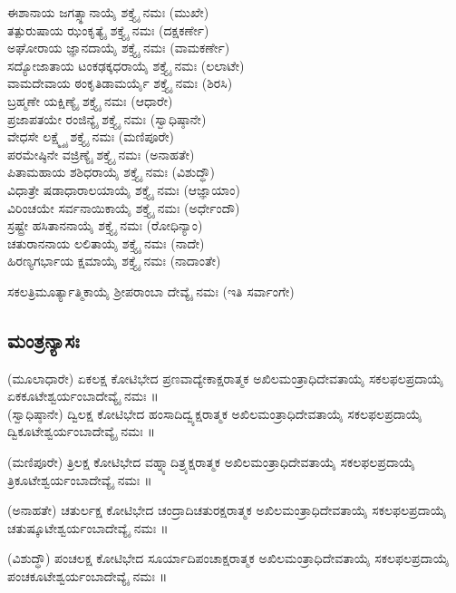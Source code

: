  ಈಶಾನಾಯ ಜಗತ್ಸ್ಥಾನಾಯೈ ಶಕ್ತ್ಯೈ ನಮಃ (ಮುಖೇ)\\
 ತತ್ಪುರುಷಾಯ ಝಂಕೃತ್ಯೈ ಶಕ್ತ್ಯೈ ನಮಃ (ದಕ್ಷಕರ್ಣೇ)\\
 ಅಘೋರಾಯ ಜ್ಞಾನದಾಯೈ ಶಕ್ತ್ಯೈ ನಮಃ (ವಾಮಕರ್ಣೇ)\\
 ಸದ್ಯೋಜಾತಾಯ ಟಂಕಢಕ್ಕಧರಾಯೈ ಶಕ್ತ್ಯೈ ನಮಃ (ಲಲಾಟೇ)\\
 ವಾಮದೇವಾಯ ಠಂಕೃತಿಡಾಮರ್ಯೈ ಶಕ್ತ್ಯೈ ನಮಃ (ಶಿರಸಿ)\\
 ಬ್ರಹ್ಮಣೇ ಯಕ್ಷಿಣ್ಯೈ ಶಕ್ತ್ಯೈ ನಮಃ (ಆಧಾರೇ)\\
 ಪ್ರಜಾಪತಯೇ ರಂಜಿನ್ಯೈ ಶಕ್ತ್ಯೈ ನಮಃ (ಸ್ವಾಧಿಷ್ಠಾನೇ)\\
 ವೇಧಸೇ ಲಕ್ಷ್ಮ್ಯೈ ಶಕ್ತ್ಯೈ ನಮಃ (ಮಣಿಪೂರೇ)\\
 ಪರಮೇಷ್ಠಿನೇ ವಜ್ರಿಣ್ಯೈ ಶಕ್ತ್ಯೈ ನಮಃ (ಅನಾಹತೇ)\\
 ಪಿತಾಮಹಾಯ ಶಶಿಧರಾಯೈ ಶಕ್ತ್ಯೈ ನಮಃ (ವಿಶುದ್ಧೌ)\\
 ವಿಧಾತ್ರೇ ಷಡಾಧಾರಾಲಯಾಯೈ ಶಕ್ತ್ಯೈ ನಮಃ (ಆಜ್ಞಾಯಾಂ)\\
 ವಿರಿಂಚಯೇ ಸರ್ವನಾಯಿಕಾಯೈ ಶಕ್ತ್ಯೈ ನಮಃ (ಅರ್ಧೇಂದೌ)\\
 ಸ್ರಷ್ಟ್ರೇ ಹಸಿತಾನನಾಯೈ ಶಕ್ತ್ಯೈ ನಮಃ (ರೋಧಿನ್ಯಾಂ)\\
 ಚತುರಾನನಾಯ ಲಲಿತಾಯೈ ಶಕ್ತ್ಯೈ ನಮಃ (ನಾದೇ)\\
 ಹಿರಣ್ಯಗರ್ಭಾಯ ಕ್ಷಮಾಯೈ ಶಕ್ತ್ಯೈ ನಮಃ (ನಾದಾಂತೇ)

  ಸಕಲತ್ರಿಮೂರ್ತ್ಯಾತ್ಮಿಕಾಯೈ  ಶ್ರೀಪರಾಂಬಾ ದೇವ್ಯೈ ನಮಃ  (ಇತಿ ಸರ್ವಾಂಗೇ)
 \subsection{ಮಂತ್ರನ್ಯಾಸಃ}
(ಮೂಲಾಧಾರೇ) ಏಕಲಕ್ಷ ಕೋಟಿಭೇದ ಪ್ರಣವಾದ್ಯೇಕಾಕ್ಷರಾತ್ಮಕ ಅಖಿಲಮಂತ್ರಾಧಿದೇವತಾಯೈ ಸಕಲಫಲಪ್ರದಾಯೈ ಏಕಕೂಟೇಶ್ವರ್ಯಂಬಾದೇವ್ಯೈ ನಮಃ ॥\\
(ಸ್ವಾಧಿಷ್ಠಾನೇ) ದ್ವಿಲಕ್ಷ ಕೋಟಿಭೇದ ಹಂಸಾದಿದ್ವ್ಯಕ್ಷರಾತ್ಮಕ ಅಖಿಲಮಂತ್ರಾಧಿದೇವತಾಯೈ ಸಕಲಫಲಪ್ರದಾಯೈ ದ್ವಿಕೂಟೇಶ್ವರ್ಯಂಬಾದೇವ್ಯೈ ನಮಃ ॥

(ಮಣಿಪೂರೇ) ತ್ರಿಲಕ್ಷ ಕೋಟಿಭೇದ ವಹ್ನ್ಯಾದಿತ್ರ್ಯಕ್ಷರಾತ್ಮಕ ಅಖಿಲಮಂತ್ರಾಧಿದೇವತಾಯೈ ಸಕಲಫಲಪ್ರದಾಯೈ ತ್ರಿಕೂಟೇಶ್ವರ್ಯಂಬಾದೇವ್ಯೈ ನಮಃ ॥

(ಅನಾಹತೇ) ಚತುರ್ಲಕ್ಷ ಕೋಟಿಭೇದ ಚಂದ್ರಾದಿಚತುರಕ್ಷರಾತ್ಮಕ ಅಖಿಲಮಂತ್ರಾಧಿದೇವತಾಯೈ ಸಕಲಫಲಪ್ರದಾಯೈ ಚತುಷ್ಕೂಟೇಶ್ವರ್ಯಂಬಾದೇವ್ಯೈ ನಮಃ ॥

(ವಿಶುದ್ಧೌ) ಪಂಚಲಕ್ಷ ಕೋಟಿಭೇದ ಸೂರ್ಯಾದಿಪಂಚಾಕ್ಷರಾತ್ಮಕ ಅಖಿಲಮಂತ್ರಾಧಿದೇವತಾಯೈ ಸಕಲಫಲಪ್ರದಾಯೈ ಪಂಚಕೂಟೇಶ್ವರ್ಯಂಬಾದೇವ್ಯೈ ನಮಃ ॥

